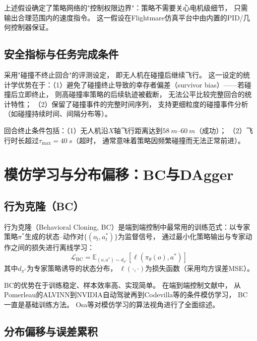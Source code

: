 上述假设确定了策略网络的"控制权限边界"：策略不需要关心电机级细节，
只需输出合理范围内的速度指令。
这一假设在Flightmare仿真平台\cite{Song2021Flightmare}中由内置的PID/几何控制器\cite{Lee2010GeometricControl}保证。

\subsection{安全指标与任务完成条件}

采用"碰撞不终止回合"的评测设定，
即无人机在碰撞后继续飞行。
这一设定的统计学优势在于：（1）避免了碰撞终止导致的幸存者偏差（survivor bias）——若碰撞后立即终止，
则高碰撞率策略的后续轨迹被截断，
无法公平比较完整回合的统计特性；
（2）保留了碰撞事件的完整时间序列，
支持更细粒度的碰撞事件分析（如碰撞持续时间、间隔分布等）。

回合终止条件包括：（1）无人机沿$X$轴飞行距离达到$\SI{58}{m}$--$\SI{60}{m}$（成功）；
（2）飞行时长超过$\tau_{\max} = \SI{40}{s}$（超时，
通常意味着策略因频繁碰撞而无法正常前进）。


\section{模仿学习与分布偏移：BC与DAgger}

\subsection{行为克隆（BC）}

行为克隆（Behavioral Cloning, BC）是端到端控制中最常用的训练范式\cite{Pomerleau1989ALVINN}：以专家策略$\pi^*$生成的状态--动作对$\{(o_t, a_t^*)\}$为监督信号，
通过最小化策略输出与专家动作之间的损失进行离线学习：
\begin{equation}
  \mathcal{L}_{\text{BC}} = \mathbb{E}_{(o,a^*) \sim d_{\pi^*}} \left[ \ell(\pi_\theta(o), a^*) \right]
  \label{eq:bc_general}
\end{equation}
其中$d_{\pi^*}$为专家策略诱导的状态分布，
$\ell(\cdot, \cdot)$为损失函数（采用均方误差MSE）。

BC的优势在于训练稳定、样本效率高、实现简单。
在端到端控制文献中，
从Pomerleau的ALVINN\cite{Pomerleau1989ALVINN}到NVIDIA自动驾驶\cite{Bojarski2016EndToEndNVIDIA}再到Codevilla等的条件模仿学习\cite{Codevilla2018EndToEndDriving}，
BC一直是基础训练方法。
Osa等\cite{Osa2018ImitationSurvey}对模仿学习的算法视角进行了全面综述。

\subsection{分布偏移与误差累积}


